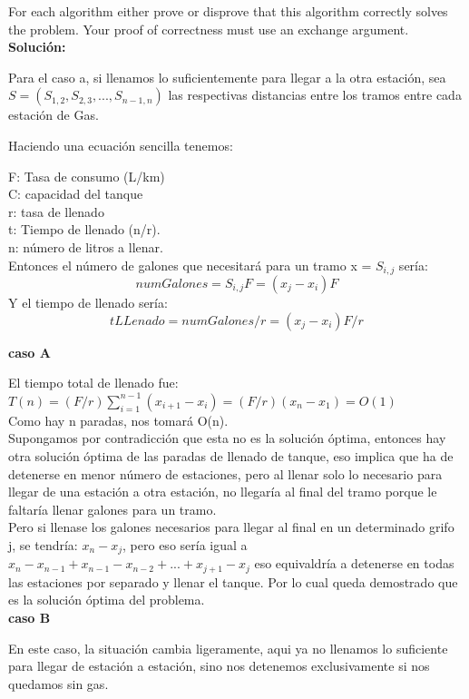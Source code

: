 \documentclass{article}
\begin{document}
For each algorithm either prove or disprove that this algorithm correctly solves the problem. Your proof of correctness must use an exchange argument.\\

\textbf{Solución:}

Para el caso a, si llenamos lo suficientemente para llegar a la otra estación, sea $S=(S_{1,2}, S_{2,3}, ..., S_{n-1,n})$ las respectivas distancias entre los tramos entre cada estación de Gas.

Haciendo una ecuación sencilla tenemos:

F: Tasa de consumo (L/km)\\
C: capacidad del tanque\\
r: tasa de llenado\\
t: Tiempo de llenado (n/r).\\
n: número de litros a llenar.\\

Entonces el número de galones que necesitará para un tramo x = $S_{i,j}$ sería:
$$
  numGalones=S_{i,j} F = (x_j - x_i)F
$$
Y el tiempo de llenado sería:
$$
  tLLenado = numGalones/r = (x_j - x_i)F/r
$$

\textbf{caso A}

El tiempo total de llenado fue: $T(n) = (F/r) \sum_{i=1}^{n-1} (x_{i+1} - x_i)=(F/r) (x_n - x_1) = O(1)$\\
Como hay n paradas, nos tomará O(n).\\

Supongamos por contradicción que esta no es la solución óptima, entonces hay otra solución óptima de las paradas de llenado de tanque, eso implica que ha de detenerse en menor número de estaciones, pero al llenar solo lo necesario para llegar de una estación a otra estación, no llegaría al final del tramo porque le faltaría llenar galones para un tramo.\\

Pero si llenase los galones necesarios para llegar al final en un determinado grifo j, se tendría: $x_{n} - x_j$, pero eso sería igual a $x_{n} - x_{n-1} + x_{n-1} - x_{n-2} + ... + x_{j+1} - x_j$ eso equivaldría a detenerse en todas las estaciones por separado y llenar el tanque. Por lo cual queda demostrado que es la solución óptima del problema.\\

\textbf{caso B}

En este caso, la situación cambia ligeramente, aqui ya no llenamos lo suficiente para llegar de estación a estación, sino nos detenemos exclusivamente si nos quedamos sin gas.
\end{document}
